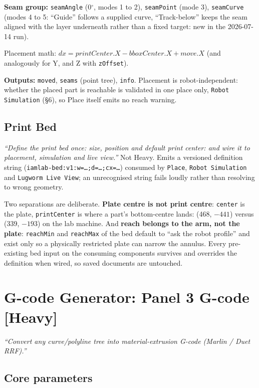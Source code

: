 \documentclass[11pt]{article}
\newcommand{\param}[1]{\texttt{#1}}
\newcommand{\iamdeg}{$^{\circ}$}
\newcommand{\heavy}{\textbf{[Heavy]}}
\begin{document}
\textbf{Seam group:} \param{seamAngle} (0\iamdeg, modes 1 to 2),
\param{seamPoint} (mode 3), \param{seamCurve} (modes 4 to 5: ``Guide''
follows a supplied curve, ``Track-below'' keeps the seam aligned with
the layer underneath rather than a fixed target: new in the
2026-07-14 run).

Placement math: \(dx = printCenter.X - bboxCenter.X + move.X\) (and
analogously for Y, and Z with \param{zOffset}).

\textbf{Outputs:} \param{moved}, \param{seams} (point tree),
\param{info}. Placement is robot-independent: whether the placed part is
reachable is validated in one place only, \param{Robot
Simulation} (\S 6), so Place itself emits no reach warning.

\subsection{Print Bed}

\emph{``Define the print bed once: size, position and default print
center: and wire it to placement, simulation and live view.''} Not
Heavy. Emits a versioned definition string
(\texttt{iamlab-bed:v1:w=\ldots;d=\ldots;cx=\ldots}) consumed by
\param{Place}, \param{Robot Simulation} and \param{Lugworm
Live View}; an unrecognised string fails loudly rather than resolving to
wrong geometry.

Two separations are deliberate. \textbf{Plate centre is not print
centre}: \param{center} is the plate, \param{printCenter} is where a
part's bottom-centre lands: (468, $-441$) versus (339, $-193$) on the
lab machine. And \textbf{reach belongs to the arm, not the plate}: \param{reachMin} and \param{reachMax} of the bed default to ``ask the robot
profile'' and exist only so a physically restricted plate can narrow the
annulus. Every pre-existing bed input on the consuming components
survives and overrides the definition when wired, so saved documents are
untouched.

\section{G-code Generator: Panel 3 G-code \heavy{}}

\emph{``Convert any curve/polyline tree into material-extrusion G-code
(Marlin / Duet RRF).''}

\subsection{Core parameters}
\end{document}

